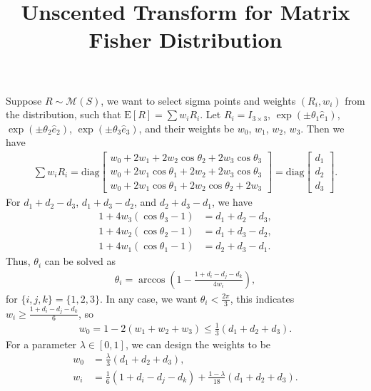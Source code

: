 \documentclass[10pt]{article}
\title{\vspace{-4ex}\textbf{Unscented Transform for Matrix Fisher Distribution\vspace{-4ex}}}
\date{}
\newcommand{\expect}[1]{\ensuremath{\mathrm{E}\left[ #1 \right]}}
\begin{document}
\maketitle

Suppose $R\sim \mathcal{M}(S)$, we want to select sigma points and weights $(R_i,w_i)$ from the distribution, such that $\expect{R} = \sum w_iR_i$.
Let $R_i = I_{3\times 3}$, $\exp(\pm\theta_1\hat{e}_1)$, $\exp(\pm\theta_2\hat{e}_2)$, $\exp(\pm\theta_3\hat{e}_3)$, and their weights be $w_0$, $w_1$, $w_2$, $w_3$.
Then we have
\begin{align}
	\sum w_iR_i = \mathrm{diag} \begin{bmatrix}
		w_0 + 2w_1 + 2w_2\cos\theta_2 + 2w_3\cos\theta_3 \\
		w_0 + 2w_1\cos\theta_1 + 2w_2 + 2w_3\cos\theta_3 \\
		w_0 + 2w_1\cos\theta_1 + 2w_2\cos\theta_2 + 2w_3
	\end{bmatrix} = \mathrm{diag} \begin{bmatrix} d_1 \\ d_2 \\ d_3 \end{bmatrix}.
\end{align}
For $d_1+d_2-d_3$, $d_1+d_3-d_2$, and $d_2+d_3-d_1$, we have
\begin{equation}
	\begin{aligned}
		1 + 4w_3(\cos\theta_3-1) &= d_1+d_2-d_3, \\
		1 + 4w_2(\cos\theta_2-1) &= d_1+d_3-d_2, \\
		1 + 4w_1(\cos\theta_1-1) &= d_2+d_3-d_1.
	\end{aligned}
\end{equation}
Thus, $\theta_i$ can be solved as
\begin{align} \label{eqn:theta}
	\theta_i = \arccos\left( 1 - \frac{1+d_i-d_j-d_k}{4w_i} \right),
\end{align}
for $\{i,j,k\} = \{1,2,3\}$.
In any case, we want $\theta_i < \frac{2\pi}{3}$, this indicates $w_i \geq \tfrac{1+d_i-d_j-d_k}{6}$, so
\begin{align}
	w_0 = 1-2(w_1+w_2+w_3) \leq \tfrac{1}{3}(d_1+d_2+d_3).
\end{align}
For a parameter $\lambda \in [0,1]$, we can design the weights to be
\begin{equation}
	\begin{aligned}
		w_0 &= \tfrac{\lambda}{3}(d_1+d_2+d_3), \\
		w_i &= \tfrac{1}{6}(1+d_i-d_j-d_k) + \tfrac{1-\lambda}{18}(d_1+d_2+d_3).
	\end{aligned}
\end{equation}
\end{document}
